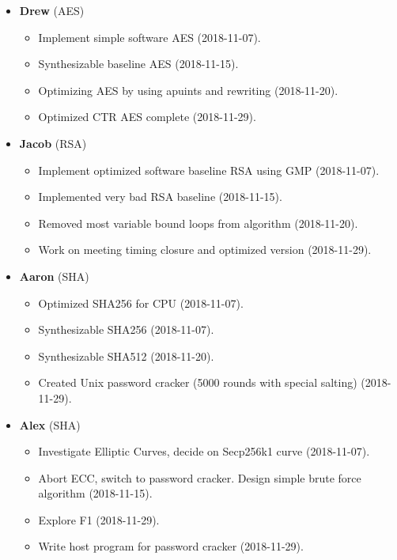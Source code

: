 \begin{itemize}
\item \textbf{Drew} (AES)

\begin{itemize}
\item Implement simple software AES (2018-11-07).
\item Synthesizable baseline AES (2018-11-15).
\item Optimizing AES by using apuints and rewriting (2018-11-20).
\item Optimized CTR AES complete (2018-11-29).
\end{itemize}

\item \textbf{Jacob} (RSA)
\begin{itemize}
\item Implement optimized software baseline RSA using GMP (2018-11-07).
\item Implemented very bad RSA baseline (2018-11-15).
\item Removed most variable bound loops from algorithm (2018-11-20).
\item Work on meeting timing closure and optimized version (2018-11-29).
\end{itemize}

\item \textbf{Aaron} (SHA)
\begin{itemize}
\item Optimized SHA256 for CPU (2018-11-07).
\item Synthesizable SHA256 (2018-11-07).
\item Synthesizable SHA512 (2018-11-20).
\item Created Unix password cracker (5000 rounds with special salting) (2018-11-29).
\end{itemize}

\item \textbf{Alex} (SHA)
\begin{itemize}
\item Investigate Elliptic Curves, decide on Secp256k1 curve (2018-11-07).
\item Abort ECC, switch to password cracker. Design simple brute force algorithm (2018-11-15).
\item Explore F1 (2018-11-29).
\item Write host program for password cracker (2018-11-29).
\end{itemize}
\end{itemize}
